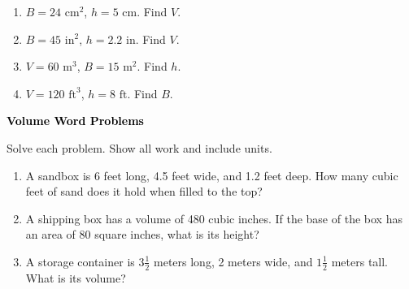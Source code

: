\documentclass[12pt, letterpaper, fleqn]{article}
\begin{document}
\begin{enumerate}[itemsep=2.3cm, leftmargin=0.6cm]

\item $B = 24\text{ cm}^2$, $h = 5\text{ cm}$. Find $V$.

\vspace{2cm}

\item $B = 45\text{ in}^2$, $h = 2.2\text{ in}$. Find $V$.

\vspace{2cm}

\item $V = 60\text{ m}^3$, $B = 15\text{ m}^2$. Find $h$.

\vspace{2cm}

\item $V = 120\text{ ft}^3$, $h = 8\text{ ft}$. Find $B$.

\vspace{2cm}

\end{enumerate}

\newpage

\begin{tcolorbox}[colback=black!10]
\large\textcolor{black}{\textbf{Volume Word Problems}}
\end{tcolorbox}

\noindent
Solve each problem. Show all work and include units.

\vspace{3mm}

\begin{enumerate}[itemsep=2.4cm, leftmargin=0.6cm]

\item A sandbox is 6 feet long, 4.5 feet wide, and 1.2 feet deep. How many cubic feet of sand does it hold when filled to the top?

\vspace{2.3cm}

\item A shipping box has a volume of 480 cubic inches. If the base of the box has an area of 80 square inches, what is its height?

\vspace{2.3cm}

\item A storage container is $3\frac{1}{2}$ meters long, 2 meters wide, and $1\frac{1}{2}$ meters tall. What is its volume?

\vspace{2.5cm}

\end{enumerate}
\end{document}

